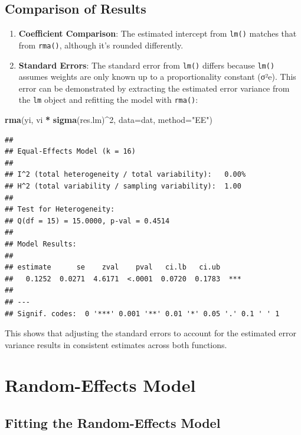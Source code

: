 \documentclass[
]{book}
\newenvironment{Shaded}{\begin{snugshade}}{\end{snugshade}}
\newcommand{\AttributeTok}[1]{\textcolor[rgb]{0.13,0.29,0.53}{#1}}
\newcommand{\DecValTok}[1]{\textcolor[rgb]{0.00,0.00,0.81}{#1}}
\newcommand{\FunctionTok}[1]{\textcolor[rgb]{0.13,0.29,0.53}{\textbf{#1}}}
\newcommand{\NormalTok}[1]{#1}
\newcommand{\SpecialCharTok}[1]{\textcolor[rgb]{0.81,0.36,0.00}{\textbf{#1}}}
\newcommand{\StringTok}[1]{\textcolor[rgb]{0.31,0.60,0.02}{#1}}
\begin{document}
\subsection{Comparison of Results}\label{comparison-of-results}

\begin{enumerate}
\def\labelenumi{\arabic{enumi}.}
\item
  \textbf{Coefficient Comparison}: The estimated intercept from \texttt{lm()} matches that from \texttt{rma()}, although it's rounded differently.
\item
  \textbf{Standard Errors}: The standard error from \texttt{lm()} differs because \texttt{lm()} assumes weights are only known up to a proportionality constant (σ²e). This error can be demonstrated by extracting the estimated error variance from the \texttt{lm} object and refitting the model with \texttt{rma()}:
\end{enumerate}

\begin{Shaded}
\begin{Highlighting}[]
\FunctionTok{rma}\NormalTok{(yi, vi }\SpecialCharTok{*} \FunctionTok{sigma}\NormalTok{(res.lm)}\SpecialCharTok{\^{}}\DecValTok{2}\NormalTok{, }\AttributeTok{data=}\NormalTok{dat, }\AttributeTok{method=}\StringTok{"EE"}\NormalTok{)}
\end{Highlighting}
\end{Shaded}

\begin{verbatim}
## 
## Equal-Effects Model (k = 16)
## 
## I^2 (total heterogeneity / total variability):   0.00%
## H^2 (total variability / sampling variability):  1.00
## 
## Test for Heterogeneity:
## Q(df = 15) = 15.0000, p-val = 0.4514
## 
## Model Results:
## 
## estimate      se    zval    pval   ci.lb   ci.ub      
##   0.1252  0.0271  4.6171  <.0001  0.0720  0.1783  *** 
## 
## ---
## Signif. codes:  0 '***' 0.001 '**' 0.01 '*' 0.05 '.' 0.1 ' ' 1
\end{verbatim}

This shows that adjusting the standard errors to account for the estimated error variance results in consistent estimates across both functions.

\section{Random-Effects Model}\label{random-effects-model}

\subsection{Fitting the Random-Effects Model}\label{fitting-the-random-effects-model}
\end{document}
